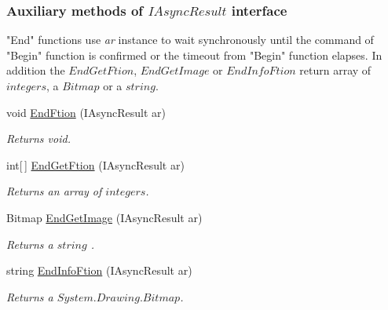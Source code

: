 \subsubsection*{Auxiliary methods of $IAsyncResult$ interface} %
\label{ssub:Auxillary methods}
"End" functions use {\itshape ar\/} instance to wait synchronously until the command of "Begin" function is confirmed
or the timeout from "Begin" function elapses.
In addition the $EndGetFtion$, $EndGetImage$ or $EndInfoFtion$ return array of $integers$, a $Bitmap$ or a $string$.
  \begin{DoxyCompactItemize}

  \item void \hyperlink{class_elib_1_1_epuck_a4e1dcc90a8562f5c12d0bb740e85095c}{EndFtion} (IAsyncResult ar)
  \begin{DoxyCompactList}\small\item\em Returns void. \item\end{DoxyCompactList}

  \item int\mbox{[}$\,$\mbox{]} \hyperlink{class_elib_1_1_epuck_af67fabd4c8d5fc5a9186b37157827512}{EndGetFtion} (IAsyncResult ar)
  \begin{DoxyCompactList}\small\item\em Returns an array of $integers$. \item\end{DoxyCompactList}

  \item Bitmap \hyperlink{class_elib_1_1_epuck_a8b2cf6f690beeab328e5a6c533cfa2b0}{EndGetImage} (IAsyncResult ar)
  \begin{DoxyCompactList}\small\item\em Returns a $string$ . \item\end{DoxyCompactList}

  \item string \hyperlink{class_elib_1_1_epuck_a74b28dea3f43cda9a42745236a2a0910}{EndInfoFtion} (IAsyncResult ar)
  \begin{DoxyCompactList}\small\item\em Returns a $System.Drawing.Bitmap$. \item\end{DoxyCompactList}

  \end{DoxyCompactItemize}

